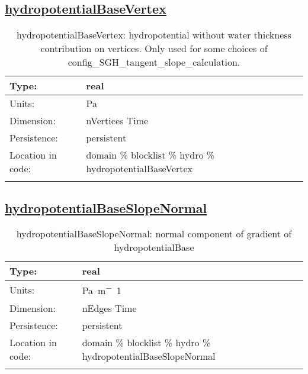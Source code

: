 \subsection[hydropotentialBaseVertex]{\hyperref[sec:var_tab_hydro]{hydropotentialBaseVertex}}
\label{subsec:var_sec_hydro_hydropotentialBaseVertex}
\begin{center}
\begin{longtable}{| p{2.0in} | p{4.0in} |}
        \hline 
        Type: & real \\
        \hline 
        Units: & \si{Pa} \\
        \hline 
        Dimension: & nVertices Time \\
        \hline 
        Persistence: & persistent \\
        \hline 
         Location in code: & domain \% blocklist \% hydro \% hydropotentialBaseVertex \\
         \hline 
    \caption{hydropotentialBaseVertex: hydropotential without water thickness contribution on vertices.  Only used for some choices of config\_SGH\_tangent\_slope\_calculation.}
\end{longtable}
\end{center}
\subsection[hydropotentialBaseSlopeNormal]{\hyperref[sec:var_tab_hydro]{hydropotentialBaseSlopeNormal}}
\label{subsec:var_sec_hydro_hydropotentialBaseSlopeNormal}
\begin{center}
\begin{longtable}{| p{2.0in} | p{4.0in} |}
        \hline 
        Type: & real \\
        \hline 
        Units: & \si{Pa.m^-1} \\
        \hline 
        Dimension: & nEdges Time \\
        \hline 
        Persistence: & persistent \\
        \hline 
         Location in code: & domain \% blocklist \% hydro \% hydropotentialBaseSlopeNormal \\
         \hline 
    \caption{hydropotentialBaseSlopeNormal: normal component of gradient of hydropotentialBase}
\end{longtable}
\end{center}
